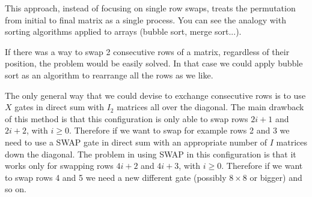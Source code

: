 This approach, instead of focusing on single row swaps, treats the permutation from initial to final matrix as a single process. You can see the analogy with sorting algorithms applied to arrays (bubble sort, merge sort...).

If there was a way to swap 2 consecutive rows of a matrix, regardless of their position, the problem would be easily solved. In that case we could apply bubble sort as an algorithm to rearrange all the rows as we like.

\bigskip

The only general way that we could devise to exchange consecutive rows is to use $X$ gates in direct sum with $I_2$ matrices all over the diagonal. The main drawback of this method is that this configuration is only able to swap rows $2i+1$ and $2i+2$, with $i \geq 0$. Therefore if we want to swap for example rows 2 and 3 we need to use a SWAP gate in direct sum with an appropriate number of $I$ matrices down the diagonal. The problem in using SWAP in this configuration is that it works only for swapping rows $4i+2$ and $4i+3$, with $i \geq 0$. Therefore if we want to swap rows 4 and 5 we need a new different gate (possibly $8 \times 8$ or bigger) and so on.


